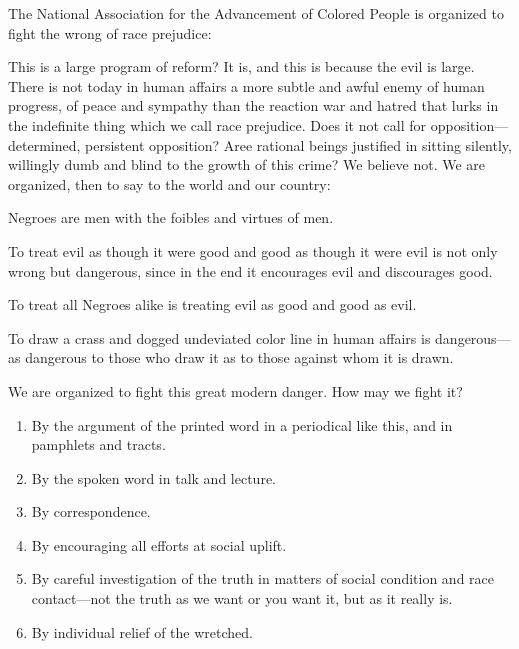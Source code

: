 \documentclass[letterpaper,10pt,english]{jupyterBook}
\begin{document}
\sphinxAtStartPar
The National Association for the Advancement of Colored People is organized to fight the wrong of race prejudice:



\sphinxAtStartPar
This is a large program of reform? It is, and this is because the evil is large. There is not to\sphinxhyphen{}day in human affairs a more subtle and awful enemy of human progress, of peace and sympathy than the reaction war and hatred that lurks in the indefinite thing which we call race prejudice. Does it not call for opposition—determined, persistent opposition? Aree rational beings justified in sitting silently, willingly dumb and blind to the growth of this crime? We believe not. We are organized, then to say to the world and our country:

\sphinxAtStartPar
Negroes are men with the foibles and virtues of men.

\sphinxAtStartPar
To treat evil as though it were good and good as though it were evil is not only wrong but dangerous, since in the end it encourages evil and discourages good.

\sphinxAtStartPar
To treat all Negroes alike is treating evil as good and good as evil.

\sphinxAtStartPar
To draw a crass and dogged undeviated color line in human affairs is dangerous—as dangerous to those who draw it as to those against whom it is drawn.

\sphinxAtStartPar
We are organized to fight this great modern danger. How may we fight it?
\begin{enumerate}
%
\item {} 
\sphinxAtStartPar
By the argument of the printed word in a periodical like this, and in pamphlets and tracts.

\item {} 
\sphinxAtStartPar
By the spoken word in talk and lecture.

\item {} 
\sphinxAtStartPar
By correspondence.

\item {} 
\sphinxAtStartPar
By encouraging all efforts at social uplift.

\item {} 
\sphinxAtStartPar
By careful investigation of the truth in matters of social condition and race contact—not the truth as we want or you want it, but as it really is.

\item {} 
\sphinxAtStartPar
By individual relief of the wretched.

\end{enumerate}
\end{document}
